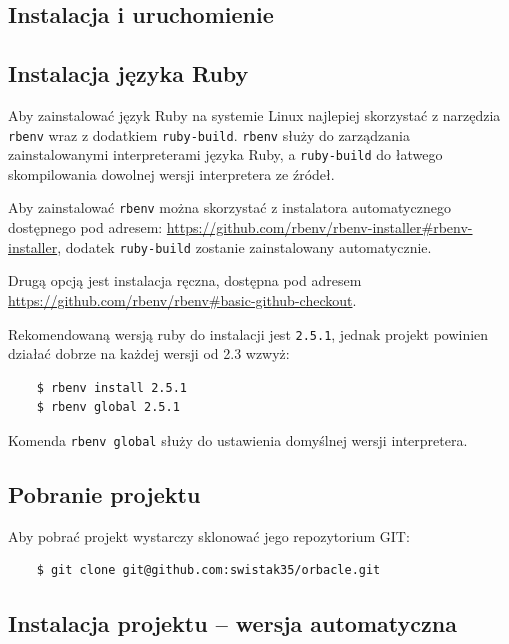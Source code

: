 \documentclass[shortabstract,mgr]{iithesis}
\begin{document}
\begin{appendices}

\chapter{Instalacja i uruchomienie}

\section{Instalacja języka Ruby}

Aby zainstalować język Ruby na systemie Linux najlepiej skorzystać z narzędzia \texttt{rbenv} wraz z dodatkiem \texttt{ruby-build}. \texttt{rbenv} służy do zarządzania zainstalowanymi interpreterami języka Ruby, a \texttt{ruby-build} do łatwego skompilowania dowolnej wersji interpretera ze źródeł.

Aby zainstalować \texttt{rbenv} można skorzystać z instalatora automatycznego dostępnego pod adresem: \url{https://github.com/rbenv/rbenv-installer#rbenv-installer}, dodatek \texttt{ruby-build} zostanie zainstalowany automatycznie.

Drugą opcją jest instalacja ręczna, dostępna pod adresem \url{https://github.com/rbenv/rbenv#basic-github-checkout}.

Rekomendowaną wersją ruby do instalacji jest \texttt{2.5.1}, jednak projekt powinien działać dobrze na każdej wersji od 2.3 wzwyż:

\begin{lstlisting}
    $ rbenv install 2.5.1
    $ rbenv global 2.5.1
\end{lstlisting}

Komenda \texttt{rbenv global} służy do ustawienia domyślnej wersji interpretera.

\section{Pobranie projektu} \label{sec:download-project}

Aby pobrać projekt wystarczy sklonować jego repozytorium GIT:

\begin{lstlisting}
    $ git clone git@github.com:swistak35/orbacle.git
\end{lstlisting}

\section{Instalacja projektu -- wersja automatyczna}


\end{appendices}
\end{document}
